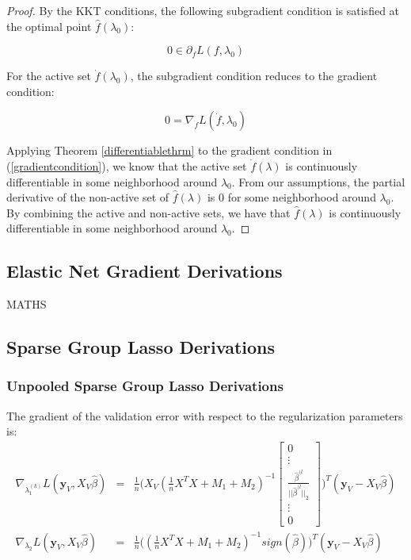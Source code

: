 \documentclass[10pt,letterpaper]{article}
\begin{document}
\begin{proof}
By the KKT conditions, the following subgradient condition is satisfied at the optimal point $\hat f(\lambda_0)$:

\begin{equation}
0 \in \partial_f L(f, \lambda_0)
\end{equation}

For the active set $\dot f(\lambda_0)$, the subgradient condition reduces to the gradient condition:

\begin{equation}
0 = \nabla_{\dot f} L(\dot f, \lambda_0)
\label{gradientcondition}
\end{equation}

Applying Theorem \ref{differentiablethrm} to the gradient condition in (\ref{gradientcondition}), we know that the active set $\dot f(\lambda)$ is continuously differentiable in some neighborhood around $\lambda_0$. From our assumptions, the partial derivative of the non-active set of $\hat f(\lambda)$ is 0 for some neighborhood around $\lambda_0$. By combining the active and non-active sets, we have that $\hat f(\lambda)$ is continuously differentiable in some neighborhood around $\lambda_0$.

\end{proof}


\subsection{Elastic Net Gradient Derivations}
MATHS

\subsection{Sparse Group Lasso Derivations}

\subsubsection{Unpooled Sparse Group Lasso Derivations}
The gradient of the validation error with respect to the regularization parameters is:
\begin{equation}
\begin{array}{lcl}
\nabla_{\lambda_1^{(k)}} L(\boldsymbol y_V, X_V \hat \beta) &=& 
\frac{1}{n}
\Bigg (
X_V
(\frac{1}{n} X^T X + M_1 + M_2)^{-1}
\begin{bmatrix}
0 \\
\vdots \\
\frac{\hat\beta^{(l}}{||\hat\beta^{(l}||_2}\\
\vdots\\
0
\end{bmatrix}
\Bigg )^T
(\boldsymbol y_V - X_V \hat \beta)
 \\
\nabla_{\lambda_2} L(\boldsymbol y_V, X_V \hat \beta) &=&
\frac{1}{n}
\Bigg (
(\frac{1}{n} X^T X + M_1 + M_2)^{-1} sign(\hat \beta)
\Bigg )^T
(\boldsymbol y_V - X_V \hat \beta)
\\ 
\end{array}
\end{equation}
\end{document}
